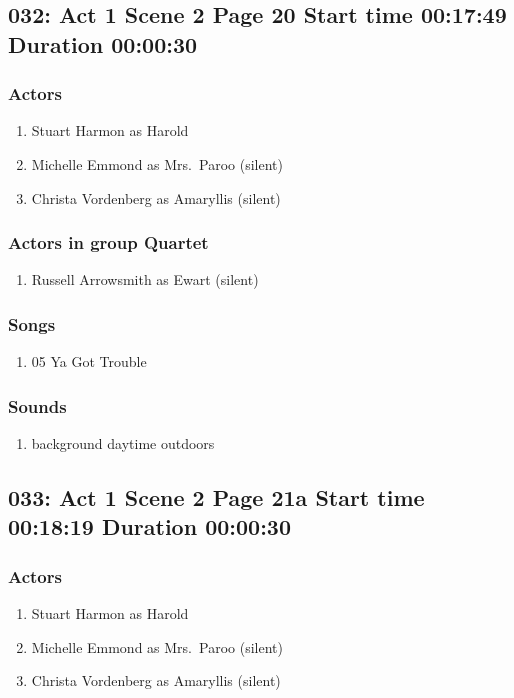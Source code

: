 \subsection{032: Act 1 Scene 2 Page 20 Start time 00:17:49 Duration 00:00:30}

\subsubsection{Actors}
\begin{enumerate}
\item Stuart Harmon as Harold
\item Michelle Emmond as Mrs.~Paroo (silent)
\item Christa Vordenberg as Amaryllis (silent)
\end{enumerate}
\subsubsection{Actors in group Quartet}
\begin{enumerate}
\item Russell Arrowsmith as Ewart (silent)
\end{enumerate}

\subsubsection{Songs}
\begin{enumerate}
\item 05 Ya Got Trouble
\end{enumerate}\subsubsection{Sounds}
\begin{enumerate}
\item background daytime outdoors
\end{enumerate}
\subsection{033: Act 1 Scene 2 Page 21a Start time 00:18:19 Duration 00:00:30}

\subsubsection{Actors}
\begin{enumerate}
\item Stuart Harmon as Harold
\item Michelle Emmond as Mrs.~Paroo (silent)
\item Christa Vordenberg as Amaryllis (silent)
\end{enumerate}
